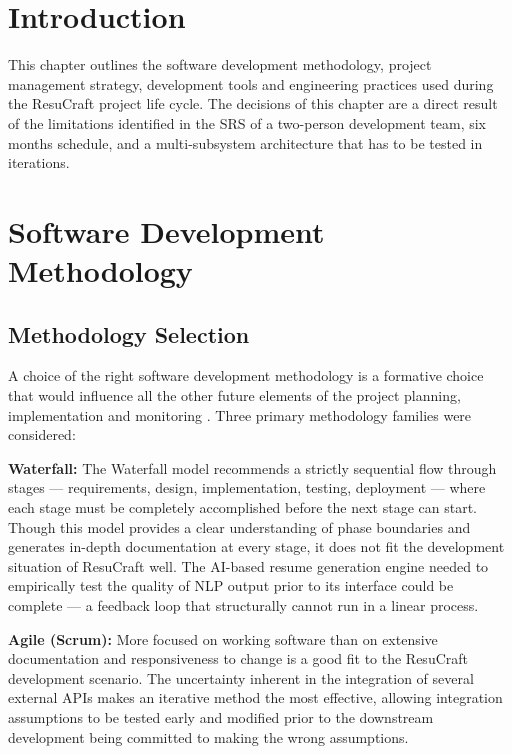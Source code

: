 \documentclass[12pt, a4paper, oneside]{report}
\begin{document}
\section{Introduction}

This chapter outlines the software development methodology, project management strategy, development tools and engineering practices used during the ResuCraft project life cycle\cite{pressman2014}. The decisions of this chapter are a direct result of the limitations identified in the SRS of a two-person development team, six months schedule, and a multi-subsystem architecture that has to be tested in iterations.

\section{Software Development Methodology}

\subsection{Methodology Selection}

A choice of the right software development methodology is a formative choice that would influence all the other future elements of the project planning, implementation and monitoring \cite{pressman2014}. Three primary methodology families were considered:

\textbf{Waterfall:} The Waterfall model recommends a strictly sequential flow through stages --- requirements, design, implementation, testing, deployment --- where each stage must be completely accomplished before the next stage can start\cite{sommerville2015}. Though this model provides a clear understanding of phase boundaries and generates in-depth documentation at every stage, it does not fit the development situation of ResuCraft well. The AI-based resume generation engine needed to empirically test the quality of NLP output prior to its interface could be complete --- a feedback loop that structurally cannot run in a linear process.

\textbf{Agile (Scrum):} More focused on working software than on extensive documentation and responsiveness to change is a good fit to the ResuCraft development scenario. The uncertainty inherent in the integration of several external APIs makes an iterative method the most effective, allowing integration assumptions to be tested early and modified prior to the downstream development being committed to making the wrong assumptions.
\end{document}
